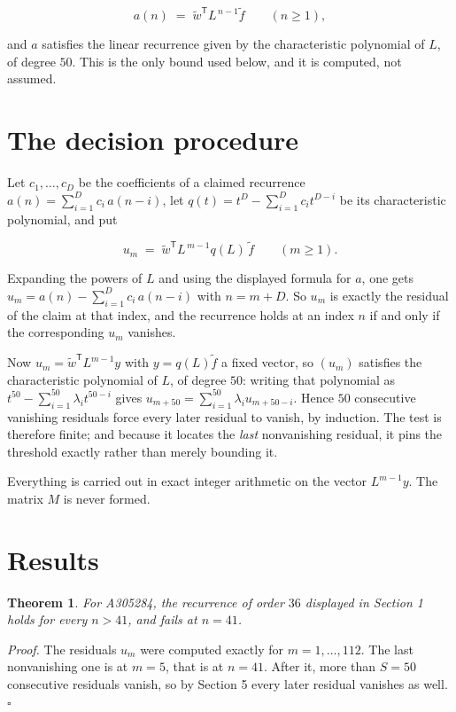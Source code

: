 \documentclass[11pt]{article}
\newtheorem{theorem}{Theorem}
\theoremstyle{definition}
\begin{document}
\[a(n) \;=\; \tilde w^{\mathsf T} L^{\,n-1} \tilde f \qquad (n \ge 1),\]

and $a$ satisfies the linear recurrence given by the characteristic polynomial of $L$, of degree $50$. This is the only bound used below, and it is computed, not assumed.

\section{The decision procedure}

Let $c_1,\dots,c_D$ be the coefficients of a claimed recurrence $a(n) = \sum_{i=1}^{D} c_i\,a(n-i)$, let $q(t) = t^{D} - \sum_{i=1}^{D} c_i t^{D-i}$ be its characteristic polynomial, and put

\[u_m \;=\; \tilde w^{\mathsf T} L^{\,m-1} q(L)\,\tilde f \qquad (m \ge 1).\]

Expanding the powers of $L$ and using the displayed formula for $a$, one gets $u_m = a(n) - \sum_{i=1}^{D} c_i\,a(n-i)$ with $n = m + D$. So $u_m$ is exactly the residual of the claim at that index, and the recurrence holds at an index $n$ if and only if the corresponding $u_m$ vanishes.

Now $u_m = \tilde w^{\mathsf T} L^{m-1} y$ with $y = q(L)\tilde f$ a fixed vector, so $(u_m)$ satisfies the characteristic polynomial of $L$, of degree $50$: writing that polynomial as $t^{50} - \sum_{i=1}^{50} \lambda_i t^{50-i}$ gives $u_{m+50} = \sum_{i=1}^{50} \lambda_i u_{m+50-i}$. Hence $50$ consecutive vanishing residuals force every later residual to vanish, by induction. The test is therefore finite; and because it locates the {\itshape last} nonvanishing residual, it pins the threshold exactly rather than merely bounding it.

Everything is carried out in exact integer arithmetic on the vector $L^{m-1}y$. The matrix $M$ is never formed.

\section{Results}

\begin{theorem} For A305284, the recurrence of order $36$ displayed in Section 1 holds for every $n > 41$, and fails at $n = 41$.\end{theorem}

{\itshape Proof.} The residuals $u_m$ were computed exactly for $m = 1,\dots,112$. The last nonvanishing one is at $m = 5$, that is at $n = 41$. After it, more than $S = 50$ consecutive residuals vanish, so by Section 5 every later residual vanishes as well. $\square$
\end{document}

